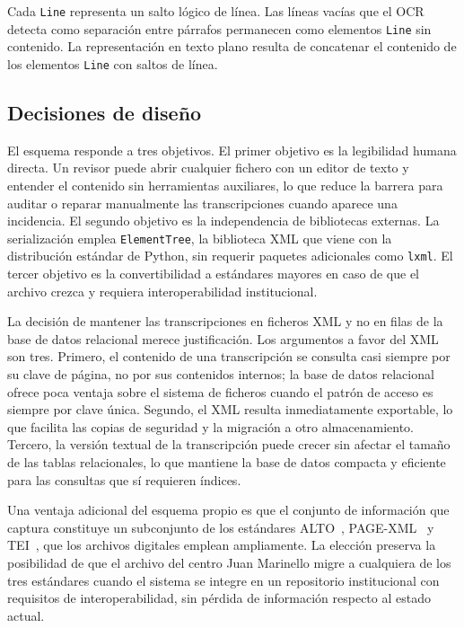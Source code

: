 Cada \texttt{Line} representa un salto lógico de línea. Las líneas vacías que el OCR detecta como separación entre párrafos permanecen como elementos \texttt{Line} sin contenido. La representación en texto plano resulta de concatenar el contenido de los elementos \texttt{Line} con saltos de línea.

\subsection{Decisiones de diseño}
\label{subsec:decisiones-xml}

El esquema responde a tres objetivos. El primer objetivo es la legibilidad humana directa. Un revisor puede abrir cualquier fichero con un editor de texto y entender el contenido sin herramientas auxiliares, lo que reduce la barrera para auditar o reparar manualmente las transcripciones cuando aparece una incidencia. El segundo objetivo es la independencia de bibliotecas externas. La serialización emplea \texttt{ElementTree}, la biblioteca XML que viene con la distribución estándar de Python, sin requerir paquetes adicionales como \texttt{lxml}. El tercer objetivo es la convertibilidad a estándares mayores en caso de que el archivo crezca y requiera interoperabilidad institucional.

La decisión de mantener las transcripciones en ficheros XML y no en filas de la base de datos relacional merece justificación. Los argumentos a favor del XML son tres. Primero, el contenido de una transcripción se consulta casi siempre por su clave de página, no por sus contenidos internos; la base de datos relacional ofrece poca ventaja sobre el sistema de ficheros cuando el patrón de acceso es siempre por clave única. Segundo, el XML resulta inmediatamente exportable, lo que facilita las copias de seguridad y la migración a otro almacenamiento. Tercero, la versión textual de la transcripción puede crecer sin afectar el tamaño de las tablas relacionales, lo que mantiene la base de datos compacta y eficiente para las consultas que sí requieren índices.

Una ventaja adicional del esquema propio es que el conjunto de información que captura constituye un subconjunto de los estándares ALTO~\cite{loc-alto}, PAGE-XML~\cite{pletschacher2010page} y TEI~\cite{tei-consortium}, que los archivos digitales emplean ampliamente. La elección preserva la posibilidad de que el archivo del centro Juan Marinello migre a cualquiera de los tres estándares cuando el sistema se integre en un repositorio institucional con requisitos de interoperabilidad, sin pérdida de información respecto al estado actual.

